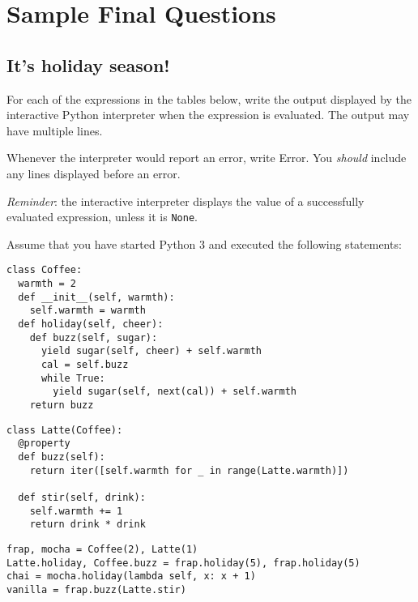 \section{Sample Final Questions}
\subsection*{It's holiday season!}
For each of the expressions in the tables below, write the output
displayed by the interactive Python interpreter when the expression is
evaluated. The output may have multiple lines.

Whenever the interpreter would report an error, write {\sc Error}. You
\emph{should} include any lines displayed before an error.

\emph{Reminder}: the interactive interpreter displays the value of a
successfully evaluated expression, unless it is {\tt None}.

Assume that you have started Python 3 and executed the following statements:
\begin{multicols}{2}
\begin{lstlisting}
class Coffee:
  warmth = 2
  def __init__(self, warmth):
    self.warmth = warmth
  def holiday(self, cheer):
    def buzz(self, sugar):
      yield sugar(self, cheer) + self.warmth
      cal = self.buzz
      while True:
        yield sugar(self, next(cal)) + self.warmth
    return buzz
\end{lstlisting}
\columnbreak
\begin{lstlisting}
class Latte(Coffee):
  @property
  def buzz(self):
    return iter([self.warmth for _ in range(Latte.warmth)])
    
  def stir(self, drink):
    self.warmth += 1
    return drink * drink
\end{lstlisting}
\end{multicols}
\begin{lstlisting}
frap, mocha = Coffee(2), Latte(1)
Latte.holiday, Coffee.buzz = frap.holiday(5), frap.holiday(5)
chai = mocha.holiday(lambda self, x: x + 1)
vanilla = frap.buzz(Latte.stir)
\end{lstlisting}


